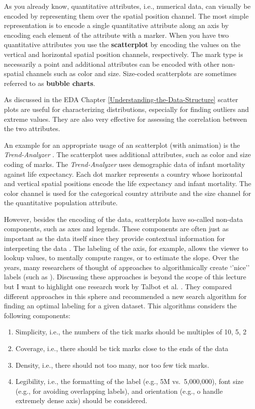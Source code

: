 \documentclass[
]{book}
\providecommand{\tightlist}{%
  \setlength{\itemsep}{0pt}\setlength{\parskip}{0pt}}
\begin{document}
As you already know, quantitative attributes, i.e., numerical data, can visually be encoded by representing them over the spatial position channel. The most simple representation is to encode a single quantitative attribute along an axis by encoding each element of the attribute with a marker. When you have two quantitative attributes you use the \textbf{scatterplot} by encoding the values on the vertical and horizontal spatial position channels, respectively. The mark type is necessarily a point and additional attributes can be encoded with other non-spatial channels such as color and size. Size-coded scatterplots are sometimes referred to as \textbf{bubble charts}.

As discussed in the EDA Chapter \ref{Understanding-the-Data-Structure} scatter plots are useful for characterizing distributions, especially for finding outliers and extreme values. They are also very effective for assessing the correlation between the two attributes.

An example for an appropriate usage of an scatterplot (with animation) is the \emph{Trend-Analyzer} \citep{Robertsonetal2008trendanalyzer}. The scatterplot uses additional attributes, such as color and size coding of marks. The \emph{Trend-Analyzer} uses demographic data of infant mortality against life expectancy. Each dot marker represents a country whose horizontal and vertical spatial positions encode the life expectancy and infant mortality. The color channel is used for the categorical country attribute and the size channel for the quantitative population attribute.

However, besides the encoding of the data, scatterplots have so-called non-data components, such as axes and legends. These components are often just as important as the data itself since they provide contextual information for interpreting the data \citep{Talbotetal2010ticklabels}. The labeling of the axis, for example, allows the viewer to lookup values, to mentally compute ranges, or to estimate the slope. Over the years, many researchers of thought of approaches to algorithmically create `'nice'' labels (such as ). Discussing these approaches is beyond the scope of this lecture but I want to highlight one research work by Talbot et al. \citep{Talbotetal2010ticklabels}. They compared different approaches in this sphere and recommended a new search algorithm for finding an optimal labeling for a given dataset. This algorithms considers the following components:

\begin{enumerate}
\def\labelenumi{\arabic{enumi}.}
\tightlist
\item
  Simplicity, i.e., the numbers of the tick marks should be multiples of 10, 5, 2
\item
  Coverage, i.e., there should be tick marks close to the ends of the data
\item
  Density, i.e., there should not too many, nor too few tick marks.
\item
  Legibility, i.e., the formatting of the label (e.g., 5M vs.~5,000,000), font size (e.g., for avoiding overlapping labels), and orientation (e.g., o handle extremely dense axis) should be considered.
\end{enumerate}
\end{document}
